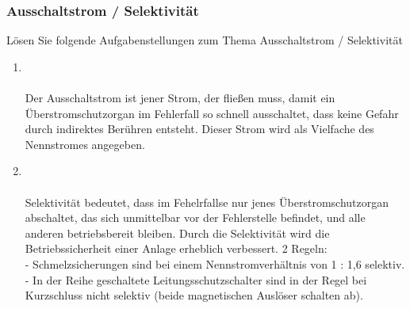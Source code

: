 \subsubsection{Ausschaltstrom / Selektivität}
Lösen Sie folgende Aufgabenstellungen zum Thema Ausschaltstrom / Selektivität

\begin{enumerate}
    \item   {} \\\\
            Der Ausschaltstrom ist jener Strom, der fließen muss, damit ein Überstromschutzorgan im Fehlerfall so schnell ausschaltet, dass keine Gefahr durch indirektes Berühren entsteht.
            Dieser Strom wird als Vielfache des Nennstromes angegeben.

    \item   {} \\\\
            Selektivität bedeutet, dass im Fehelrfallse nur jenes Überstromschutzorgan abschaltet, das sich unmittelbar vor der Fehlerstelle befindet, und alle anderen betriebsbereit bleiben.
            Durch die Selektivität wird die Betriebssicherheit einer Anlage erheblich verbessert.
            2 Regeln: \\
            - Schmelzsicherungen sind bei einem Nennstromverhältnis von 1 : 1,6 selektiv. \\
            - In der Reihe geschaltete Leitungsschutzschalter sind in der Regel bei Kurzschluss nicht selektiv (beide magnetischen Auslöser schalten ab).  
\end{enumerate}